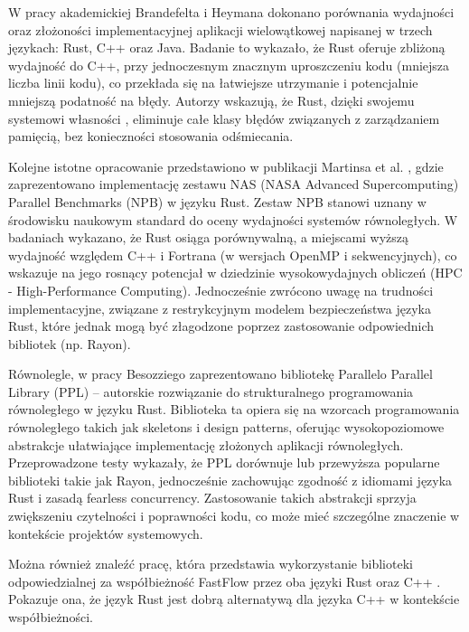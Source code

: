 W pracy akademickiej Brandefelta i Heymana \cite{heyman2020comparison} dokonano porównania wydajności oraz złożoności implementacyjnej aplikacji wielowątkowej napisanej w trzech językach: Rust, C++ oraz Java. Badanie to wykazało, że Rust oferuje zbliżoną wydajność do C++, przy jednoczesnym znacznym uproszczeniu kodu (mniejsza liczba linii kodu), co przekłada się na łatwiejsze utrzymanie i potencjalnie mniejszą podatność na błędy. Autorzy wskazują, że Rust, dzięki swojemu systemowi własności , eliminuje całe klasy błędów związanych z zarządzaniem pamięcią, bez konieczności stosowania odśmiecania.

Kolejne istotne opracowanie przedstawiono w publikacji Martinsa et al. \cite{martins2025npbrustnasparallelbenchmarks}, gdzie zaprezentowano implementację zestawu NAS (NASA Advanced Supercomputing) Parallel Benchmarks (NPB) \cite{nasaParallelBenchmarks} w języku Rust. Zestaw NPB stanowi uznany w środowisku naukowym standard do oceny wydajności systemów równoległych. W badaniach wykazano, że Rust osiąga porównywalną, a miejscami wyższą wydajność względem C++ i Fortrana (w wersjach OpenMP i sekwencyjnych), co wskazuje na jego rosnący potencjał w dziedzinie wysokowydajnych obliczeń (HPC - High-Performance Computing). Jednocześnie zwrócono uwagę na trudności implementacyjne, związane z restrykcyjnym modelem bezpieczeństwa języka Rust, które jednak mogą być złagodzone poprzez zastosowanie odpowiednich bibliotek (np. Rayon).

Równolegle, w pracy Besozziego \cite{Besozzi} zaprezentowano bibliotekę Parallelo Parallel Library (PPL) – autorskie rozwiązanie do strukturalnego programowania równoległego w języku Rust. Biblioteka ta opiera się na wzorcach programowania równoległego takich jak skeletons i design patterns, oferując wysokopoziomowe abstrakcje ułatwiające implementację złożonych aplikacji równoległych. Przeprowadzone testy wykazały, że PPL dorównuje lub przewyższa popularne biblioteki takie jak Rayon, jednocześnie zachowując zgodność z idiomami języka Rust i zasadą fearless concurrency. Zastosowanie takich abstrakcji sprzyja zwiększeniu czytelności i poprawności kodu, co może mieć szczególne znaczenie w kontekście projektów systemowych.

Można również znaleźć pracę, która przedstawia wykorzystanie biblioteki odpowiedzialnej za współbieżność FastFlow przez oba języki Rust oraz C++ \cite{FastFlow}. Pokazuje ona, że język Rust jest dobrą alternatywą dla języka C++ w kontekście współbieżności.

% 


